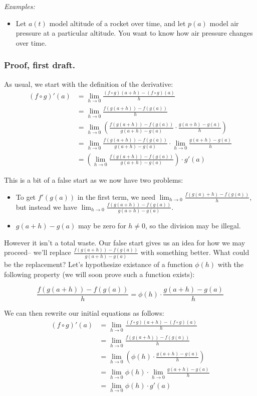 \textit{Examples:}
\begin{itemize}
\item Let $a(t)$ model altitude of a rocket over time, and let $p(a)$
  model air pressure at a particular altitude. You want to know how
  air pressure changes over time.
\end{itemize}

\subsubsection*{Proof, first draft.}

As usual, we start with the definition of the derivative:
\begin{align*}
  (f\circ g)'(a)&=\lim_{h\to0}\frac{(f\circ g)(a+h)-(f\circ g)(a)}{h}\\
            &=\lim_{h\to0}\frac{f(g(a+h))-f(g(a))}{h}\\
            &=\lim_{h\to0}\left(\frac{f(g(a+h))-f(g(a))}{g(a+h)-g(a)}\cdot\frac{g(a+h)-g(a)}{h}\right)\\
            &=\lim_{h\to0}\frac{f(g(a+h))-f(g(a))}{g(a+h)-g(a)}\cdot\lim_{h\to0}\frac{g(a+h)-g(a)}{h}\\
            &=\left(\lim_{h\to0}\frac{f(g(a+h))-f(g(a))}{g(a+h)-g(a)}\right)\cdot g'(a)
\end{align*}

This is a bit of a false start as we now have two problems:
\begin{itemize}
\item To get $f'(g(a))$ in the first term, we need
  $\lim_{h\to0}\frac{f(g(a)+h)-f(g(a))}{h}$, but instead we have
  $\lim_{h\to0}\frac{f(g(a+h))-f(g(a))}{g(a+h)-g(a)}$.
\item $g(a+h)-g(a)$ may be zero for $h\neq 0$, so the division may be
  illegal.
\end{itemize}

However it isn't a total waste. Our false start gives us an idea for
how we may proceed-- we'll replace
$\frac{f(g(a+h))-f(g(a))}{g(a+h)-g(a)}$ with something
better. What could be the replacement? Let's hypothesize existance of
a function $\phi(h)$ with the following property (we will soon prove such
a function exists):

\[\frac{f(g(a+h))-f(g(a))}{h}=\phi(h)\cdot\frac{g(a+h)-g(a)}{h}\]

We can then rewrite our initial equations as follows:
\begin{align*}
  (f\circ g)'(a)&=\lim_{h\to0}\frac{(f\circ g)(a+h)-(f\circ g)(a)}{h}\\
            &=\lim_{h\to0}\frac{f(g(a+h))-f(g(a))}{h}\\
            &=\lim_{h\to0}\left(\phi(h)\cdot\frac{g(a+h)-g(a)}{h}\right)\\
            &=\lim_{h\to0}\phi(h)\cdot\lim_{h\to0}\frac{g(a+h)-g(a)}{h}\\
            &=\lim_{h\to0}\phi(h)\cdot g'(a)
\end{align*}

